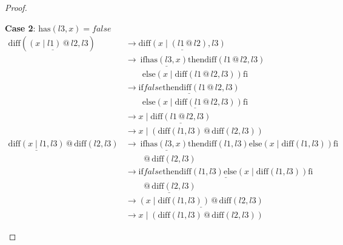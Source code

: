 \documentclass[12pt, a4paper]{article}
\newcommand{\rel}[1]{\mathrel{#1}}
\newcommand{\rmx}[1]{\mathrm{#1}}
\newcommand{\larrow}{\longrightarrow}
\newcommand{\under}{\underline}
\begin{document}
\begin{proof}
\begin{description}
\textbf{Case 2}: $\rmx{has}(l3, x) = false$
\begin{align*}
\rmx{diff}(\under{(x \rel{|} l1) \rel{@} l2}, l3)
	&\larrow \under{\rmx{diff}(x \rel{|} (l1 \rel{@} l2), l3)} \tag{by } \\
	&\larrow\ \rel{\rmx{if}} \under{\rmx{has}(l3, x)} \rel{\rmx{then}} \rmx{diff}(l1 \rel{@} l2, l3) \\
	&\quad \quad \rel{\rmx{else}} (x \rel{|} \rmx{diff}(l1 \rel{@} l2, l3)) \rel{\rmx{fi}} \tag{by diff2} \\
	&\larrow \under{\rel{\rmx{if}} false \rel{\rmx{then}} \rmx{diff}(l1 \rel{@} l2, l3)} \\
	&\quad \quad \under{\rel{\rmx{else}} (x \rel{|} \rmx{diff}(l1 \rel{@} l2, l3)) \rel{\rmx{fi}}} \tag{by case splitting} \\
	&\larrow x \rel{|} \under{\rmx{diff}(l1 \rel{@} l2, l3)} \tag{by if2} \\
	&\larrow x \rel{|} (\rmx{diff}(l1, l3) \rel{@} \rmx{diff}(l2, l3)) \tag{by IH} \\
\under{\rmx{diff}(x \rel{|} l1, l3)} \rel{@} \rmx{diff}(l2, l3)
	&\larrow\ \rel{\rmx{if}} \under{\rmx{has}(l3, x)} \rel{\rmx{then}} \rmx{diff}(l1, l3) \rel{\rmx{else}} (x \rel{|} \rmx{diff}(l1, l3)) \rel{\rmx{fi}} \\
	&\quad \quad \rel{@} \rmx{diff}(l2, l3) \tag{by diff2} \\
	&\larrow \under{\rel{\rmx{if}} false \rel{\rmx{then}} \rmx{diff}(l1, l3) \rel{\rmx{else}} (x \rel{|} \rmx{diff}(l1, l3)) \rel{\rmx{fi}}} \\
	&\quad \quad \under{\rel{@} \rmx{diff}(l2, l3)} \tag{by case splitting} \\
	&\larrow \under{(x \rel{|} \rmx{diff}(l1, l3)) \rel{@} \rmx{diff}(l2, l3)} \tag{by if2} \\
	&\larrow x \rel{|} (\rmx{diff}(l1, l3) \rel{@} \rmx{diff}(l2, l3)) \tag{by @2}
\end{align*}

\end{description}
\end{proof}
\end{document}
